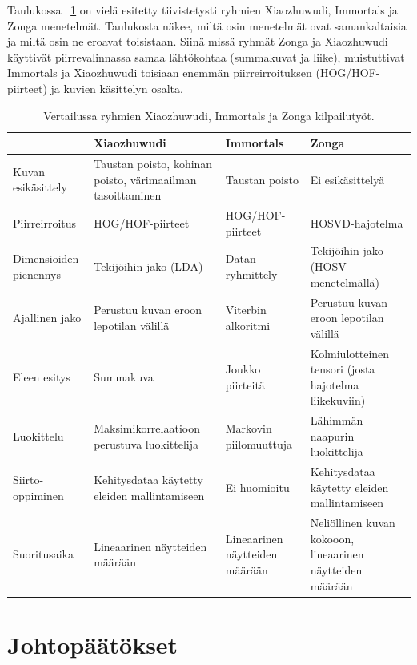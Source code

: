 Taulukossa ~\ref{table:kolmetyötä} on vielä esitetty tiivistetysti ryhmien Xiaozhuwudi, Immortals ja Zonga menetelmät.
Taulukosta näkee, miltä osin menetelmät ovat samankaltaisia ja miltä osin ne eroavat toisistaan. Siinä missä ryhmät
Zonga ja Xiaozhuwudi käyttivät piirrevalinnassa samaa lähtökohtaa (summakuvat ja liike), muistuttivat Immortals ja Xiaozhuwudi
toisiaan enemmän piirreirroituksen (HOG/HOF-piirteet) ja kuvien käsittelyn osalta. \\

\begin{table}[th]
\caption{Vertailussa ryhmien Xiaozhuwudi, Immortals ja Zonga kilpailutyöt. \citep{firstround}}
\label{table:kolmetyötä}
\begin{center}
\begin{tabular}{|p{}|p{}|p{}|p{}|} 
    \hline
 & Xiaozhuwudi & Immortals & Zonga\\
    \hline
    \hline
 Kuvan esikäsittely & Taustan poisto, kohinan poisto, värimaailman tasoittaminen& Taustan poisto & Ei esikäsittelyä\\
    \hline
 Piirreirroitus & HOG/HOF-piirteet & HOG/HOF-piirteet & HOSVD-hajotelma \\
    \hline
 Dimensioiden pienennys & Tekijöihin jako (LDA)& Datan ryhmittely & Tekijöihin jako (HOSV-menetelmällä)\\
    \hline	
 Ajallinen jako &Perustuu kuvan eroon lepotilan välillä &Viterbin alkoritmi &Perustuu kuvan eroon lepotilan välillä\\
     \hline
 Eleen esitys &Summakuva &Joukko piirteitä &Kolmiulotteinen tensori (josta hajotelma liikekuviin)\\
     \hline
 Luokittelu &Maksimikorrelaatioon perustuva luokittelija &Markovin piilomuuttuja &Lähimmän naapurin luokittelija\\
      \hline
 Siirto-oppiminen &Kehitysdataa käytetty eleiden mallintamiseen&Ei huomioitu&Kehitysdataa käytetty eleiden mallintamiseen\\
      \hline
 Suoritusaika &Lineaarinen näytteiden määrään&Lineaarinen näytteiden määrään &Neliöllinen kuvan kokooon, lineaarinen näytteiden määrään\\
      \hline
	  \hline
\end{tabular}
\end{center}
\end{table}
\newpage
\section {Johtopäätökset}

